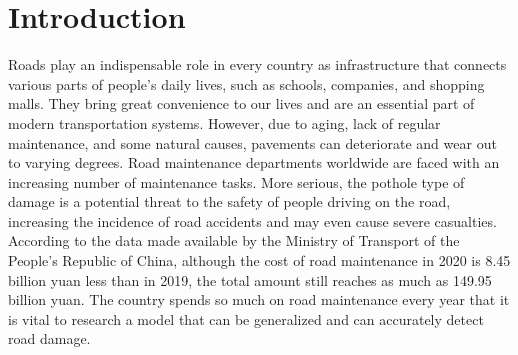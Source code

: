 \documentclass[sensors,article,submit,moreauthors]{Definitions/mdpi}
\begin{document}


    \section{Introduction}

    Roads play an indispensable role in every country as infrastructure that connects various parts of people's daily lives, such as schools, companies, and shopping malls. They bring great convenience to our lives and are an essential part of modern transportation systems. However, due to aging, lack of regular maintenance, and some natural causes, pavements can deteriorate and wear out to varying degrees. Road maintenance departments worldwide are faced with an increasing number of maintenance tasks. More serious, the pothole type of damage is a potential threat to the safety of people driving on the road, increasing the incidence of road accidents and may even cause severe casualties. According to the data made available by the Ministry of Transport of the People's Republic of China, although the cost of road maintenance in 2020 is 8.45 billion yuan less than in 2019, the total amount still reaches as much as 149.95 billion yuan\citep{MOT2021}. The country spends so much on road maintenance every year that it is vital to research a model that can be generalized and can accurately detect road damage.
\end{document}
